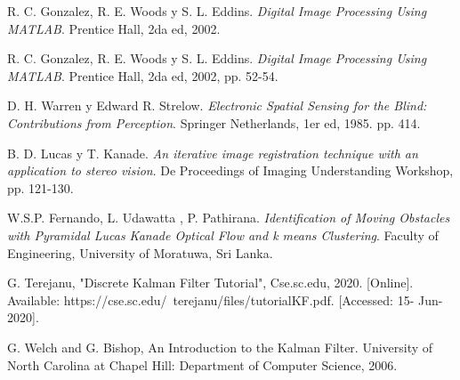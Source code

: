 \begin{thebibliography}{9}

R. C. Gonzalez, R. E. Woods y S. L. Eddins. \textit{Digital Image Processing Using MATLAB}. Prentice Hall, 2da ed, 2002.%

R. C. Gonzalez, R. E. Woods y S. L. Eddins. \textit{Digital Image Processing Using MATLAB}. Prentice Hall, 2da ed, 2002, pp. 52-54.

D. H. Warren y Edward R. Strelow. \textit{Electronic Spatial Sensing for the Blind: Contributions from Perception}. Springer Netherlands, 1er ed, 1985. pp. 414.

B. D. Lucas y T. Kanade. \textit{An iterative image registration technique with an application to stereo vision}. De Proceedings of Imaging Understanding Workshop, pp. 121-130.


W.S.P. Fernando, L. Udawatta , P. Pathirana. \textit{Identification of Moving Obstacles with Pyramidal
Lucas Kanade Optical Flow and k means
Clustering}. Faculty of Engineering, University of Moratuwa, Sri Lanka.

G. Terejanu, "Discrete Kalman Filter Tutorial", Cse.sc.edu, 2020. [Online]. Available: https://cse.sc.edu/~terejanu/files/tutorialKF.pdf. [Accessed: 15- Jun- 2020].

G. Welch and G. Bishop, An Introduction to the Kalman Filter. University of North Carolina at Chapel Hill: Department of Computer Science, 2006.

\end{thebibliography}


